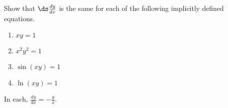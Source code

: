 {Show that $\ds \frac{dy}{dx}$ is the same for each of the following implicitly defined equations.
\begin{enumerate}
\item		$xy=1$
\item		$x^2y^2=1$
\item		$\sin(xy) = 1$
\item		$\ln (xy) =1$
\end{enumerate}
}
{In each, $\frac{dy}{dx} = -\frac yx$.
}
